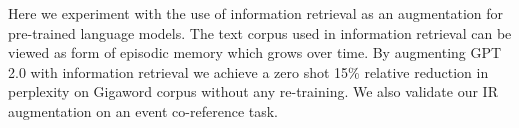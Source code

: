 Here we experiment with the use of information retrieval as an augmentation for pre-trained language models. The text corpus used in information retrieval can be viewed as form of episodic memory which grows over time. By augmenting GPT 2.0 with information retrieval we achieve a zero shot 15\% relative reduction in perplexity on Gigaword corpus without any re-training. We also validate our IR augmentation on an event co-reference task.
